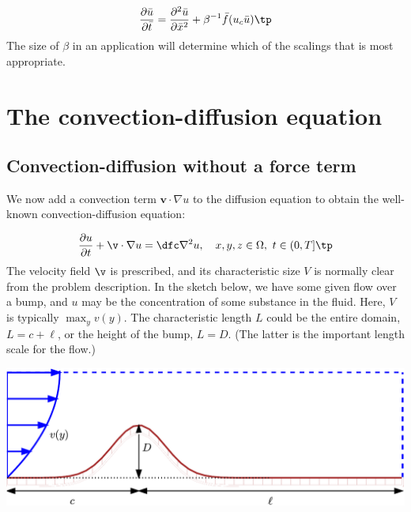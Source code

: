 \documentclass[graybox,envcountchap,sectrefs,final]{svmonodo}
\begin{document}
\begin{equation}
\frac{\partial\bar u}{\partial\bar t} =
\frac{\partial^2\bar u}{\partial \bar x^2} + \beta^{-1}\bar f(u_c\bar u)\tp
\end{equation}
The size of $\beta$ in an application will determine which of the scalings
that is most appropriate.


\section{The convection-diffusion equation}
\label{scale:convdiff}

\subsection{Convection-diffusion without a force term}


We now add a convection term $\bm{v}\cdot\nabla u$ to the diffusion
equation to obtain the well-known convection-diffusion equation:

\begin{equation}
\frac{\partial u}{\partial t} + \v\cdot\nabla u =
\dfc\nabla^2 u,
\quad  x,y, z\in \Omega,\ t\in (0, T]\tp
\label{scale:convdiff:pde1}
\end{equation}
The velocity field $\v$ is prescribed, and its characteristic size $V$
is normally clear from the problem description. In the sketch below,
we have some given flow over a bump, and $u$ may be the concentration
of some substance in the fluid. Here, $V$ is typically $\max_y v(y)$.
The characteristic length $L$ could be the entire domain, $L=c+\ell$,
or the height of the bump, $L=D$. (The latter is the important length
scale for the flow.)



\vspace{3mm}




\vspace{3mm}





\centerline{\includegraphics[width=0.9\linewidth]{fig-scaling/flow_over_gaussian.pdf}}
\end{document}
